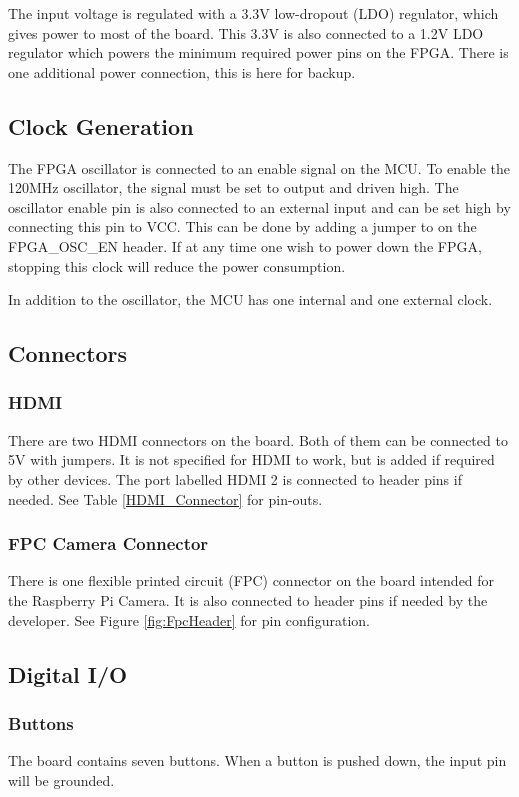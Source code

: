 The input voltage is regulated with a 3.3V low-dropout (LDO) regulator, which gives power to most of the board.
This 3.3V is also connected to a 1.2V LDO regulator which powers the minimum required power pins on the FPGA. There is one additional power connection, this is here for backup.

\subsection{Clock Generation}
The FPGA oscillator is connected to an enable signal on the MCU.
To enable the 120MHz oscillator, the signal must be set to output and driven high.
The oscillator enable pin is also connected to an external input and can be set high by connecting this pin to VCC.
This can be done by adding a jumper to on the FPGA\_OSC\_EN header. If at any time one wish to power down the FPGA, stopping this clock will reduce the power consumption.

In addition to the oscillator, the MCU has one internal and one external clock.

\subsection{Connectors}
\subsubsection{HDMI}
There are two HDMI connectors on the board.
Both of them can be connected to 5V with jumpers. It is not specified for HDMI to work, but is added if required by other devices.
The port labelled HDMI 2 is connected to header pins if needed.
See Table \ref{HDMI_Connector} for pin-outs.

\subsubsection{FPC Camera Connector}
There is one flexible printed circuit (FPC) connector on the board intended for the Raspberry Pi Camera.
It is also connected to header pins if needed by the developer.
See Figure \ref{fig:FpcHeader} for pin configuration.

\subsection{Digital I/O}
\subsubsection{Buttons}
The board contains seven buttons.
When a button is pushed down, the input pin will be grounded.

